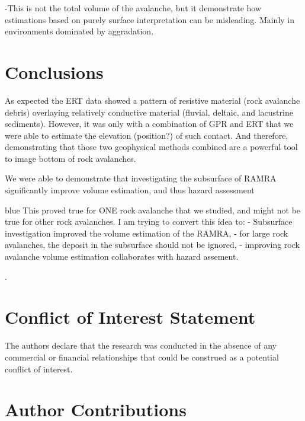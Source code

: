 \documentclass[utf8]{frontiersSCNS}
\newcommand{\COMON}{\begin{color}{blue}}
\newcommand{\COMOFF}{\end{color}}
\begin{document}
-This is not the total volume of the avalanche, but it demonstrate how estimations based on purely surface interpretation can be misleading. Mainly in environments dominated by aggradation. 




\section{Conclusions}


As expected the ERT data showed a pattern of resistive material (rock avalanche debris) overlaying relatively conductive material (fluvial, deltaic, and lacustrine sediments). However, it was only with a combination of GPR and ERT that we were able to estimate the elevation (position?) of such contact. And therefore, demonstrating that those two geophysical methods combined are a powerful tool to image bottom of rock avalanches.  

We were able to demonstrate that investigating the subsurface of RAMRA significantly improve volume estimation, and thus hazard assessment 
     
     \COMON 
     This proved true for ONE rock avalanche that we studied, and might not be true for other rock avalanches. I am trying to convert this idea to:
     - Subsurface investigation improved the volume estimation of the RAMRA,
     - for large rock avalanches, the deposit in the subsurface should not be ignored,
     - improving rock avalanche volume estimation collaborates with hazard assement. 
      \COMOFF. 



\section*{Conflict of Interest Statement}

The authors declare that the research was conducted in the absence of any commercial or financial relationships that could be construed as a potential conflict of interest.


\section*{Author Contributions}
\end{document}
